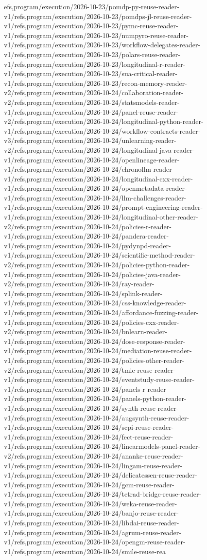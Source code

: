 \documentclass[11pt,a4paper,openany]{book}
\begin{document}
efs,program/execution/2026-10-23/pomdp-py-reuse-reader-v1/refs,program/execution/2026-10-23/pomdps-jl-reuse-reader-v1/refs,program/execution/2026-10-23/pymc-reuse-reader-v1/refs,program/execution/2026-10-23/numpyro-reuse-reader-v1/refs,program/execution/2026-10-23/workflow-delegates-reader-v1/refs,program/execution/2026-10-23/polars-reuse-reader-v1/refs,program/execution/2026-10-23/longitudinal-r-reader-v1/refs,program/execution/2026-10-23/sua-critical-reader-v1/refs,program/execution/2026-10-23/recon-memory-reader-v2/refs,program/execution/2026-10-24/collaboration-reader-v2/refs,program/execution/2026-10-24/statsmodels-reader-v1/refs,program/execution/2026-10-24/panel-reuse-reader-v2/refs,program/execution/2026-10-24/longitudinal-python-reader-v1/refs,program/execution/2026-10-24/workflow-contracts-reader-v3/refs,program/execution/2026-10-24/unlearning-reader-v2/refs,program/execution/2026-10-24/longitudinal-java-reader-v1/refs,program/execution/2026-10-24/openlineage-reader-v1/refs,program/execution/2026-10-24/chronollm-reader-v1/refs,program/execution/2026-10-24/longitudinal-cxx-reader-v1/refs,program/execution/2026-10-24/openmetadata-reader-v1/refs,program/execution/2026-10-24/llm-challenges-reader-v1/refs,program/execution/2026-10-24/prompt-engineering-reader-v1/refs,program/execution/2026-10-24/longitudinal-other-reader-v2/refs,program/execution/2026-10-24/policies-r-reader-v1/refs,program/execution/2026-10-24/pandera-reader-v1/refs,program/execution/2026-10-24/pydynpd-reader-v1/refs,program/execution/2026-10-24/scientific-method-reader-v2/refs,program/execution/2026-10-24/policies-python-reader-v1/refs,program/execution/2026-10-24/policies-java-reader-v2/refs,program/execution/2026-10-24/ray-reader-v1/refs,program/execution/2026-10-24/splink-reader-v1/refs,program/execution/2026-10-24/css-knowledge-reader-v1/refs,program/execution/2026-10-24/affordance-fuzzing-reader-v1/refs,program/execution/2026-10-24/policies-cxx-reader-v2/refs,program/execution/2026-10-24/bnlearn-reader-v1/refs,program/execution/2026-10-24/dose-response-reader-v1/refs,program/execution/2026-10-24/mediation-reuse-reader-v1/refs,program/execution/2026-10-24/policies-other-reader-v2/refs,program/execution/2026-10-24/tmle-reuse-reader-v1/refs,program/execution/2026-10-24/eventstudy-reuse-reader-v1/refs,program/execution/2026-10-24/panels-r-reader-v1/refs,program/execution/2026-10-24/panels-python-reader-v1/refs,program/execution/2026-10-24/synth-reuse-reader-v1/refs,program/execution/2026-10-24/augsynth-reuse-reader-v1/refs,program/execution/2026-10-24/scpi-reuse-reader-v1/refs,program/execution/2026-10-24/fect-reuse-reader-v1/refs,program/execution/2026-10-24/linearmodels-panel-reader-v2/refs,program/execution/2026-10-24/ananke-reuse-reader-v1/refs,program/execution/2026-10-24/lingam-reuse-reader-v1/refs,program/execution/2026-10-24/delicatessen-reuse-reader-v1/refs,program/execution/2026-10-24/gcm-reuse-reader-v1/refs,program/execution/2026-10-24/tetrad-bridge-reuse-reader-v1/refs,program/execution/2026-10-24/weka-reuse-reader-v1/refs,program/execution/2026-10-24/banjo-reuse-reader-v1/refs,program/execution/2026-10-24/libdai-reuse-reader-v1/refs,program/execution/2026-10-24/agrum-reuse-reader-v1/refs,program/execution/2026-10-24/opengm-reuse-reader-v1/refs,program/execution/2026-10-24/smile-reuse-rea
\end{document}
